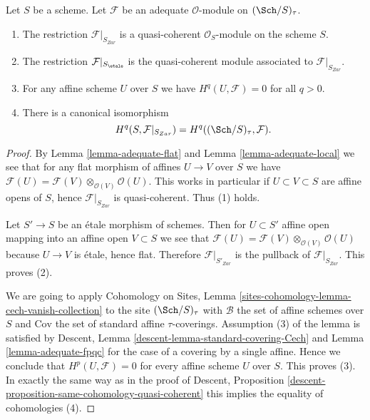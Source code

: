 \begin{lemma}
\label{lemma-same-cohomology-adequate}
Let $S$ be a scheme. Let $\mathcal{F}$ be an adequate
$\mathcal{O}$-module on $(\Sch/S)_\tau$.
\begin{enumerate}
\item The restriction $\mathcal{F}|_{S_{Zar}}$ is a quasi-coherent
$\mathcal{O}_S$-module on the scheme $S$.
\item The restriction $\mathcal{F}|_{S_\etale}$ is the
quasi-coherent module associated to $\mathcal{F}|_{S_{Zar}}$.
\item For any affine scheme $U$ over $S$ we have $H^q(U, \mathcal{F}) = 0$
for all $q > 0$.
\item There is a canonical isomorphism
$$
H^q(S, \mathcal{F}|_{S_{Zar}}) =
H^q((\Sch/S)_\tau, \mathcal{F}).
$$
\end{enumerate}
\end{lemma}

\begin{proof}
By
Lemma \ref{lemma-adequate-flat}
and
Lemma \ref{lemma-adequate-local}
we see that for any flat morphism of affines $U \to V$ over $S$
we have
$\mathcal{F}(U) = \mathcal{F}(V) \otimes_{\mathcal{O}(V)} \mathcal{O}(U)$.
This works in particular if $U \subset V \subset S$ are affine opens of
$S$, hence $\mathcal{F}|_{S_{Zar}}$ is quasi-coherent.
Thus (1) holds.

\medskip\noindent
Let $S' \to S$ be an \'etale morphism of schemes.
Then for $U \subset S'$ affine open mapping into an affine open
$V \subset S$ we see that
$\mathcal{F}(U) = \mathcal{F}(V) \otimes_{\mathcal{O}(V)} \mathcal{O}(U)$
because $U \to V$ is \'etale, hence flat. Therefore
$\mathcal{F}|_{S'_{Zar}}$ is the pullback of $\mathcal{F}|_{S_{Zar}}$.
This proves (2).

\medskip\noindent
We are going to apply
Cohomology on Sites,
Lemma \ref{sites-cohomology-lemma-cech-vanish-collection}
to the site $(\Sch/S)_\tau$ with
$\mathcal{B}$ the set of affine schemes over $S$ and
$\text{Cov}$ the set of standard affine $\tau$-coverings.
Assumption (3) of the lemma is satisfied by
Descent, Lemma \ref{descent-lemma-standard-covering-Cech}
and
Lemma \ref{lemma-adequate-fpqc}
for the case of a covering by a single affine.
Hence we conclude that $H^p(U, \mathcal{F}) = 0$ for every
affine scheme $U$ over $S$. This proves (3).
In exactly the same way as in the proof of
Descent, Proposition \ref{descent-proposition-same-cohomology-quasi-coherent}
this implies the equality of cohomologies (4).
\end{proof}

